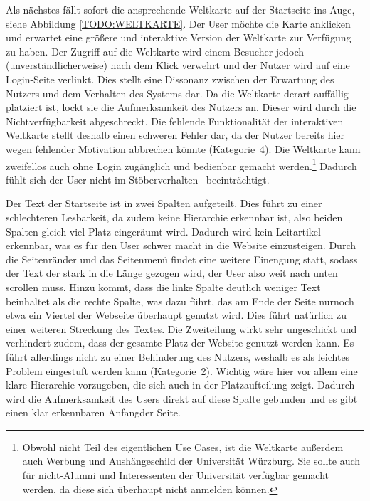 {Als nächstes fällt sofort die ansprechende Weltkarte auf der Startseite ins Auge, siehe Abbildung \ref{TODO:WELTKARTE}. 
Der User möchte die Karte anklicken und erwartet eine größere und interaktive Version der Weltkarte zur Verfügung zu haben.
Der Zugriff auf die Weltkarte wird einem Besucher jedoch (unverständlicherweise) nach dem Klick verwehrt und der Nutzer wird auf eine Login-Seite verlinkt. 
Dies stellt eine Dissonanz zwischen der Erwartung des Nutzers und dem Verhalten des Systems dar.
}{Da die Weltkarte derart auffällig platziert ist, lockt sie die Aufmerksamkeit des Nutzers an. Dieser wird durch die Nichtverfügbarkeit abgeschreckt. 
Die fehlende Funktionalität der interaktiven Weltkarte stellt deshalb einen schweren Fehler dar, da der Nutzer bereits hier wegen fehlender Motivation abbrechen könnte (Kategorie~4).}
{Die Weltkarte kann zweifellos auch ohne Login zugänglich und bedienbar gemacht werden.\footnote{Obwohl nicht Teil des eigentlichen Use Cases, ist die Weltkarte außerdem auch Werbung und Aushängeschild der Universität Würzburg. Sie sollte auch für nicht-Alumni und Interessenten der Universität verfügbar gemacht werden, da diese sich überhaupt nicht anmelden können.}
Dadurch fühlt sich der User nicht im \glqq Stöberverhalten\grqq~ beeinträchtigt.
}\label{prob:start:weltkarte}

{Der Text der Startseite ist in zwei Spalten aufgeteilt. Dies führt zu einer schlechteren Lesbarkeit, da zudem keine Hierarchie erkennbar ist, also beiden Spalten gleich viel Platz eingeräumt wird.
Dadurch wird kein Leitartikel erkennbar, was es für den User schwer macht in die Website einzusteigen. 
Durch die Seitenränder und das Seitenmenü findet eine weitere Einengung statt, sodass der Text der stark in die Länge gezogen wird, der User also weit nach unten scrollen muss.
Hinzu kommt, dass die linke Spalte deutlich weniger Text beinhaltet als die rechte Spalte, was dazu führt, das am Ende der Seite nurnoch etwa ein Viertel der Webseite überhaupt genutzt wird. Dies führt natürlich zu einer weiteren Streckung des Textes. 
}{Die Zweiteilung wirkt sehr ungeschickt und verhindert zudem, dass der gesamte Platz der Website genutzt werden kann. Es führt allerdings nicht zu einer Behinderung des Nutzers, weshalb es als leichtes Problem eingestuft werden kann (Kategorie~2).
}{Wichtig wäre hier vor allem eine klare Hierarchie vorzugeben, die sich auch in der Platzaufteilung zeigt. Dadurch wird die Aufmerksamkeit des Users direkt auf diese Spalte gebunden und es gibt einen klar erkennbaren \glqq Anfang\grqq der Seite.}

